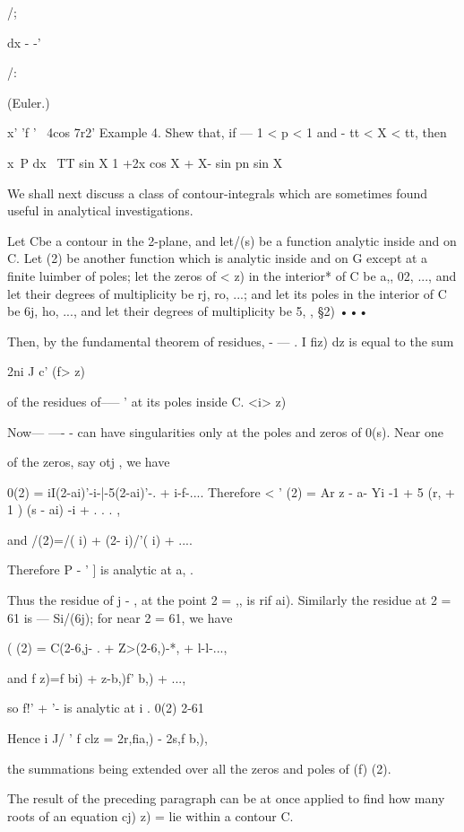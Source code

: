 /;

  dx - -'

/:

(Euler.)

   x' 'f ' ~4cos 7r2' Example 4. Shew that, if — 1 < p < 1 and - tt <
X < tt, then

x~P dx \ TT sin X 1 +2x cos X + X- sin pn sin X

 We shall next discuss a class of contour-integrals which are
sometimes found useful in analytical investigations.

Let Cbe a contour in the 2-plane, and let/(s) be a function analytic
inside and on C. Let (2) be another function which is analytic inside
and on G except at a finite luimber of poles; let the zeros of < z)
in the interior* of C be a,, 02, ..., and let their degrees of
multiplicity be rj, ro, ...; and let its poles in the interior of C
be 6j, ho, ..., and let their degrees of multiplicity be 5, , §2) •••

Then, by the fundamental theorem of residues, - — . I fiz) dz is equal
to the sum

 2ni J c' (f> z)

of the residues of--— ' at its poles inside C. <i> z)

Now— —- - can have singularities only at the poles and zeros of 0(s).
Near one

of the zeros, say otj , we have

0(2) = iI(2-ai)'-i-|-5(2-ai)'-. + i-f-.... Therefore < ' (2) = Ar z -
a- Yi -1 + 5 (r, + 1 ) (s - ai) -i + . . . ,

and /(2)=/( i) + (2- i)/'( i) + ....

Therefore P - ' ] is analytic at a, .

Thus the residue of j - , at the point 2 = ,, is rif ai). Similarly
the residue at 2 = 61 is — Si/(6j); for near 2 = 61, we have

( (2) = C(2-6,j- . + Z>(2-6,)-*, + l-l-...,

and f z)=f bi) + z-b,)f' b,) + ...,

so f!' + '- is analytic at i . 0(2) 2-61

Hence i J/ ' f clz = 2r,fia,) - 2s,f b,),

the summations being extended over all the zeros and poles of (f) (2).

The result of the preceding paragraph can be at once applied to find
how many roots of an equation cj) z) = lie within a contour C.

